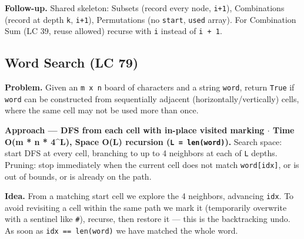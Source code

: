 \documentclass[11pt]{article}
\begin{document}
\textbf{Follow-up.} Shared skeleton: Subsets (record every node, \texttt{i+1}), Combinations (record at depth \texttt{k}, \texttt{i+1}), Permutations (no \texttt{start}, \texttt{used} array). For Combination Sum (LC 39, reuse allowed) recurse with \texttt{i} instead of \texttt{i\ +\ 1}.

\subsection{Word Search (LC 79)}\label{word-search-lc-79}

\textbf{Problem.} Given an \texttt{m\ x\ n} board of characters and a string \texttt{word}, return \texttt{True} if \texttt{word} can be constructed from sequentially adjacent (horizontally/vertically) cells, where the same cell may not be used more than once.

\textbf{Approach --- DFS from each cell with in-place visited marking \(\cdot\) Time O(m * n * 4\^{}L), Space O(L) recursion (\texttt{L\ =\ len(word)}).} Search space: start DFS at every cell, branching to up to 4 neighbors at each of \texttt{L} depths. Pruning: stop immediately when the current cell does not match \texttt{word{[}idx{]}}, or is out of bounds, or is already on the path.

\textbf{Idea.} From a matching start cell we explore the 4 neighbors, advancing \texttt{idx}. To avoid revisiting a cell within the same path we mark it (temporarily overwrite with a sentinel like \texttt{\textquotesingle{}\#\textquotesingle{}}), recurse, then restore it --- this is the backtracking undo. As soon as \texttt{idx\ ==\ len(word)} we have matched the whole word.

\end{document}
